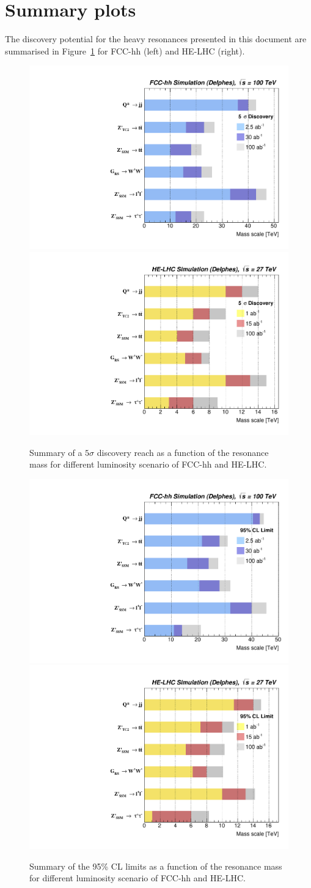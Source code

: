 \documentclass[a4paper,11pt]{article}
\begin{document}
\section{Summary plots}
The discovery potential for the heavy resonances presented in this document are summarised in Figure~\ref{figure:resonances100:summary} for FCC-hh (left) and HE-LHC (right).
\begin{figure}[!htb]
  \centering
  \includegraphics[width=0.49\columnwidth]{Fig/summaryDisco_onlyFCChh.pdf}
  \includegraphics[width=0.49\columnwidth]{Fig/summaryDisco_onlyHELHC.pdf}
  \caption{Summary of a $5\sigma$ discovery reach as a function of the resonance mass for different luminosity scenario of FCC-hh and HE-LHC.}
  \label{figure:resonances100:summary}
\end{figure}

\begin{figure}[!htb]
  \centering
  \includegraphics[width=0.49\columnwidth]{Fig/summaryLimit_onlyFCChh.pdf}
  \includegraphics[width=0.49\columnwidth]{Fig/summaryLimit_onlyHELHC.pdf}
  \caption{Summary of the 95\% CL limits as a function of the resonance mass for different luminosity scenario of FCC-hh and HE-LHC.}
  \label{figure:resonances100:summarylimit}
\end{figure}
\end{document}
